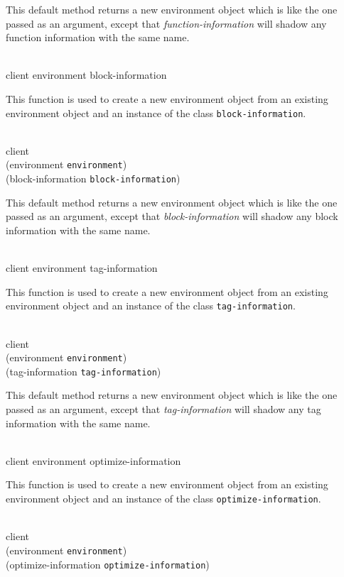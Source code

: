 This default method returns a new environment object which is like the
one passed as an argument, except that \textit{function-information}
will shadow any function information with the same name.

\\
            {client environment block-information}

This function is used to create a new environment object from an
existing environment object and an instance of the class
\texttt{block-information}.

\\
           {client\\
            (environment {\tt environment})\\
            (block-information {\tt block-information})}

This default method returns a new environment object which is like the
one passed as an argument, except that \textit{block-information}
will shadow any block information with the same name.

\\
            {client environment tag-information}

This function is used to create a new environment object from an
existing environment object and an instance of the class
\texttt{tag-information}.

\\
           {client\\
            (environment {\tt environment})\\
            (tag-information {\tt tag-information})}

This default method returns a new environment object which is like the
one passed as an argument, except that \textit{tag-information}
will shadow any tag information with the same name.

\\
            {client environment optimize-information}

This function is used to create a new environment object from an
existing environment object and an instance of the class
\texttt{optimize-information}.

\\
           {client\\
            (environment {\tt environment})\\
            (optimize-information {\tt optimize-information})}

